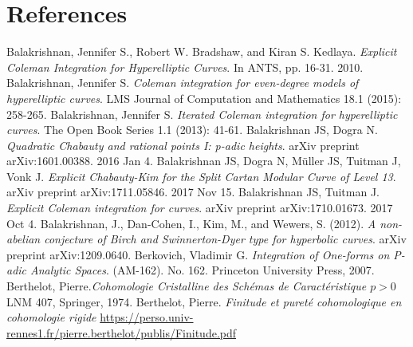 \documentclass[10pt,]{book}
\numberwithin{equation}{section}
\newcommand{\gt}{>}
\begin{document}
\chapter*{References}\hypertarget{references-1}{}
\begin{thebibliography}{9}
\hypertarget{bib-balakrishnan-bradshaw-kedlaya}{}Balakrishnan, Jennifer S., Robert W. Bradshaw, and Kiran S. Kedlaya. \textit{Explicit Coleman Integration for Hyperelliptic Curves}. In ANTS, pp. 16-31. 2010.
\hypertarget{bib-balakrishnan-even}{}Balakrishnan, Jennifer S. \textit{Coleman integration for even-degree models of hyperelliptic curves}. LMS Journal of Computation and Mathematics 18.1 (2015): 258-265.
\hypertarget{bib-balakrishnan-iterated}{}Balakrishnan, Jennifer S. \textit{Iterated Coleman integration for hyperelliptic curves}. The Open Book Series 1.1 (2013): 41-61.
\hypertarget{bib-balakrishnan-dogra}{}Balakrishnan JS, Dogra N. \textit{Quadratic Chabauty and rational points I: p-adic heights}. arXiv preprint arXiv:1601.00388. 2016 Jan 4.
\hypertarget{bib-balakrishnan-dogra-muller-tuitman-vonk}{}Balakrishnan JS, Dogra N, Müller JS, Tuitman J, Vonk J. \textit{Explicit Chabauty-Kim for the Split Cartan Modular Curve of Level 13}. arXiv preprint arXiv:1711.05846. 2017 Nov 15.
\hypertarget{bib-balakrishnan-tuitman}{}Balakrishnan JS, Tuitman J. \textit{Explicit Coleman integration for curves}. arXiv preprint arXiv:1710.01673. 2017 Oct 4.
\hypertarget{bib-bala-nonab}{}Balakrishnan, J., Dan-Cohen, I., Kim, M., and Wewers, S. (2012). \textit{A non-abelian conjecture of Birch and Swinnerton-Dyer type for hyperbolic curves}. arXiv preprint arXiv:1209.0640.
\hypertarget{bib-berkovich}{}Berkovich, Vladimir G.  \textit{Integration of One-forms on P-adic Analytic Spaces}. (AM-162). No. 162. Princeton University Press, 2007.
\hypertarget{bib-berth1}{}Berthelot, Pierre.\textit{Cohomologie Cristalline des Schémas de Caractéristique \(p\gt 0\)} LNM 407, Springer, 1974.
\hypertarget{bib-berth2}{}Berthelot, Pierre.  \textit{Finitude et pureté cohomologique en cohomologie rigide} \url{https://perso.univ-rennes1.fr/pierre.berthelot/publis/Finitude.pdf}

\end{thebibliography}
\end{document}
